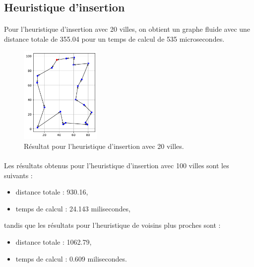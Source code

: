\documentclass[a4paper,11pt,fleqn]{article}
\begin{document}
\subsection*{Heuristique d'insertion}
\paragraph{}
Pour l'heuristique d'insertion avec 20 villes, on obtient un graphe fluide avec une distance totale de 355.04 pour un temps de calcul de 535 microsecondes.
\begin{figure}[H]
    \centering
    \includegraphics[width=0.35\textwidth]{images/insertion_20_villes.pdf}
    \caption{Résultat pour l'heuristique d'insertion avec 20 villes.}
    \label{fig:insert-20}
\end{figure}
\paragraph{}
Les résultats obtenus pour l'heuristique d'insertion avec 100 villes sont les suivants :

\begin{itemize}
    \item distance totale : 930.16,
    \item temps de calcul : 24.143 milisecondes,
\end{itemize}

tandis que les résultats pour l'heuristique de voisins plus proches sont :

\begin{itemize}
    \item distance totale : 1062.79,
    \item temps de calcul : 0.609 milisecondes.
\end{itemize}
\end{document}
